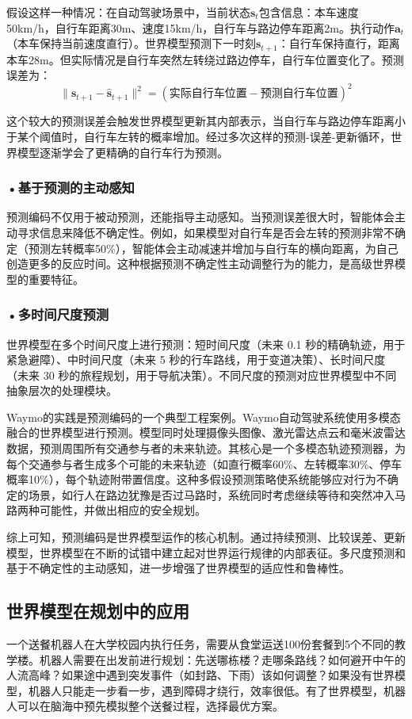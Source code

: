 假设这样一种情况：在自动驾驶场景中，当前状态$\mathbf{s}_t$包含信息：本车速度50km/h，自行车距离30m、速度15km/h，自行车与路边停车距离2m。执行动作$\mathbf{a}_t$（本车保持当前速度直行）。世界模型预测下一时刻$\mathbf{s}_{t+1}$：自行车保持直行，距离本车28m。但实际情况是自行车突然左转绕过路边停车，自行车位置变化了。预测误差为：
\[
\| \mathbf{s}_{t+1} - \hat{\mathbf{s}}_{t+1} \|^2 = (\text{实际自行车位置} - \text{预测自行车位置})^2
\]

这个较大的预测误差会触发世界模型更新其内部表示，当自行车与路边停车距离小于某个阈值时，自行车左转的概率增加。经过多次这样的预测-误差-更新循环，世界模型逐渐学会了更精确的自行车行为预测。

\subsubsection*{\textbf{•基于预测的主动感知}}

预测编码不仅用于被动预测，还能指导主动感知。当预测误差很大时，智能体会主动寻求信息来降低不确定性。例如，如果模型对自行车是否会左转的预测非常不确定（预测左转概率50\%），智能体会主动减速并增加与自行车的横向距离，为自己创造更多的反应时间。这种根据预测不确定性主动调整行为的能力，是高级世界模型的重要特征。

\subsubsection*{\textbf{•多时间尺度预测}}

世界模型在多个时间尺度上进行预测：短时间尺度（未来 0.1 秒的精确轨迹，用于紧急避障）、中时间尺度（未来 5 秒的行车路线，用于变道决策）、长时间尺度（未来 30 秒的旅程规划，用于导航决策）。不同尺度的预测对应世界模型中不同抽象层次的处理模块。

Waymo的实践是预测编码的一个典型工程案例。Waymo自动驾驶系统使用多模态融合的世界模型进行预测。模型同时处理摄像头图像、激光雷达点云和毫米波雷达数据，预测周围所有交通参与者的未来轨迹。其核心是一个多模态轨迹预测器，为每个交通参与者生成多个可能的未来轨迹（如直行概率60\%、左转概率30\%、停车概率10\%），每个轨迹附带置信度。这种多假设预测策略使系统能够应对行为不确定的场景，如行人在路边犹豫是否过马路时，系统同时考虑继续等待和突然冲入马路两种可能性，并做出相应的安全规划。

综上可知，预测编码是世界模型运作的核心机制。通过持续预测、比较误差、更新模型，世界模型在不断的试错中建立起对世界运行规律的内部表征。多尺度预测和基于不确定性的主动感知，进一步增强了世界模型的适应性和鲁棒性。

\subsection{世界模型在规划中的应用}
一个送餐机器人在大学校园内执行任务，需要从食堂运送100份套餐到5个不同的教学楼。机器人需要在出发前进行规划：先送哪栋楼？走哪条路线？如何避开中午的人流高峰？如果途中遇到突发事件（如封路、下雨）该如何调整？如果没有世界模型，机器人只能走一步看一步，遇到障碍才绕行，效率很低。有了世界模型，机器人可以在脑海中预先模拟整个送餐过程，选择最优方案。


